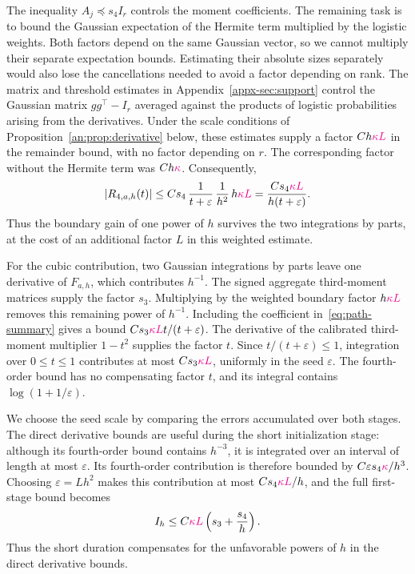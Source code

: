 \documentclass[11pt,letterpaper]{article}
\newcommand{\vSix}[1]{{\color{magenta}#1}}
\theoremstyle{remark}
\begin{document}
{{
The inequality \(A_j\preceq s_4I_r\) controls the moment
coefficients. The remaining task is to bound the Gaussian
expectation of the Hermite term multiplied by the logistic weights.
Both factors depend on the same Gaussian vector, so we cannot
multiply their separate expectation bounds.
Estimating their absolute sizes separately would also lose the
cancellations needed to avoid a factor depending on rank.
The matrix and threshold estimates in
Appendix~\ref{appx-sec:support} control the Gaussian matrix
\(gg^\top-I_r\) averaged against the products of logistic
probabilities arising from the derivatives. Under the scale
conditions of Proposition~\ref{an:prop:derivative} {below}, these estimates
supply a factor \(Ch\vSix{\kappa L}\) in the remainder bound, with no factor
depending on \(r\). The corresponding factor without the Hermite
term was \(Ch\vSix{\kappa}\).
Consequently,
\[
 |R_{4,a,h}(t)|
 \le Cs_4\,\frac1{t+\varepsilon}\,\frac1{h^2}\,h\vSix{\kappa L}
 =\frac{Cs_4\vSix{\kappa L}}{h(t+\varepsilon)}.
\]
Thus the boundary gain of one power of \(h\) survives the two
integrations by parts, at the cost of an additional factor \(L\)
in this weighted estimate.

For the cubic contribution, two Gaussian integrations by parts
leave one derivative of \(F_{a,h}\), which contributes \(h^{-1}\).
The signed aggregate third-moment matrices supply the factor
\(s_3\). Multiplying by the weighted boundary factor \(h\vSix{\kappa L}\)
removes this remaining power of \(h^{-1}\).
Including the coefficient in~\eqref{eq:path-summary} gives a bound
\(Cs_3\vSix{\kappa L}t/(t+\varepsilon)\).
The derivative of the calibrated third-moment multiplier
\(1-t^2\) supplies the factor \(t\). Since \(t/(t+\varepsilon)\le1\),
integration over \(0\le t\le1\) contributes at most \(Cs_3\vSix{\kappa L}\),
uniformly in the seed \(\varepsilon\). The fourth-order bound
has no compensating factor \(t\), and its integral contains
\(\log(1+1/\varepsilon)\).

We choose the seed scale by comparing the errors accumulated over
both stages. The direct derivative bounds are useful during the short
initialization stage: although its fourth-order bound contains
\(h^{-3}\), it is integrated over an interval of length at most
\(\varepsilon\). Its fourth-order contribution is therefore bounded by
\(C\varepsilon s_4\vSix{\kappa}/h^3\). Choosing \(\varepsilon=Lh^2\)
makes this contribution at most \(Cs_4\vSix{\kappa L}/h\), and the full
first-stage bound becomes
\[
 I_h\le C\vSix{\kappa L}\left(s_3+\frac{s_4}{h}\right).
\]
Thus the short duration compensates for the unfavorable powers of
\(h\) in the direct derivative bounds.

}}
\end{document}
